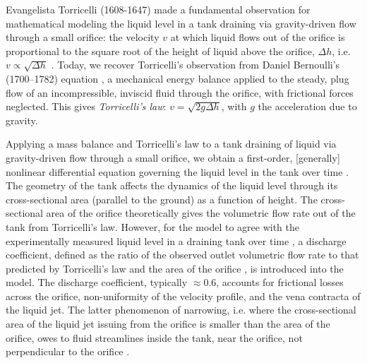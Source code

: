 \documentclass[openacc]{rsproca_new}%
\begin{document}

Evangelista Torricelli (1608-1647) made a fundamental observation for mathematical modeling the liquid level in a tank draining via gravity-driven flow through a small orifice: the velocity $v$ at which liquid flows out of the orifice is proportional to the square root of the height of liquid above the orifice, $\Delta h$, i.e. $v\propto \sqrt{\Delta h}$ \cite{mills1982newton}.
Today, we recover Torricelli's observation from Daniel Bernoulli's (1700–1782) equation \cite{welty2020fundamentals}, a mechanical energy balance applied to the steady, plug flow of an incompressible, inviscid fluid through the orifice, with frictional forces neglected. This gives \emph{Torricelli's law}: $v=\sqrt{2 g \Delta h}$, with $g$ the acceleration due to gravity. \cite{d2021torricelli,teoman2022discharge}

Applying a mass balance and Torricelli's law to a tank draining of liquid via gravity-driven flow through a small orifice, we obtain a first-order, [generally] nonlinear differential equation governing the liquid level in the tank over time \cite{groetsch1993inverse,seborg2016process,debook}.
The geometry of the tank affects the dynamics of the liquid level through its cross-sectional area (parallel to the ground) as a function of height.
The cross-sectional area of the orifice theoretically gives the volumetric flow rate out of the tank from Torricelli's law. 
However, for the model to agree with the experimentally measured liquid level in a draining tank over time \cite{de2000pin,blasone2015discharge,wadhwa2021study,liu2008drainage}, a discharge coefficient, defined as the ratio of the observed outlet volumetric flow rate to that predicted by Torricelli's law and the area of the orifice \cite{hicks2014determining}, is introduced into the model. 
The discharge coefficient, typically $\approx$0.6,
accounts for frictional losses across the orifice, non-uniformity of the velocity profile, and the vena contracta of the liquid jet.
The latter phenomenon of narrowing, i.e. where the cross-sectional area of the liquid jet issuing from the orifice is smaller than the area of the orifice, owes to fluid streamlines inside the tank, near the orifice, not perpendicular to the orifice \cite{horsch2020simple}. 
\cite{teoman2022discharge,hicks2014determining,blasone2015discharge,lienhard1984velocity,wadhwa2021study}
\end{document}

